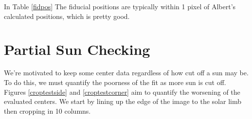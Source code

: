 \documentclass[10pt]{scrartcl}
\begin{document}
In Table \ref{fidpos} The fiducial positions are typically within 1 pixel of Albert's calculated positions, which is pretty good.

\section{Partial Sun Checking} %
\label{sec:partial_sun_checking}

We're motivated to keep some center data regardless of how cut off a sun may be. To do this, we must quantify the poorness of the fit as more sun is cut off. Figures \ref{croptestside} and \ref{croptestcorner} aim to quantify the worsening of the evaluated centers. We start by lining up the edge of the image to the solar limb then cropping in 10 columns. \\
\end{document}
